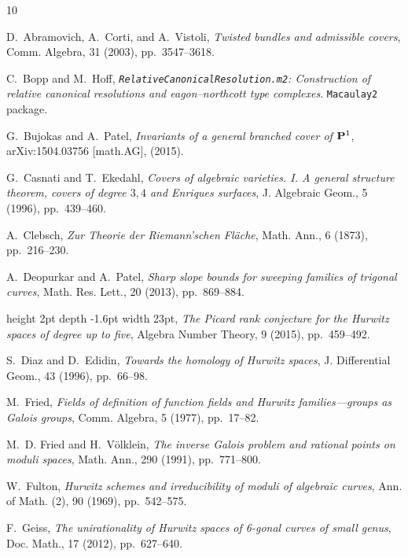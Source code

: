 \documentclass{amsart}
\numberwithin{equation}{section}
\begin{document}
\def\cprime{$'$}
\begin{thebibliography}{10}

{\sc D.~Abramovich, A.~Corti, and A.~Vistoli}, {\em Twisted bundles and
  admissible covers}, Comm. Algebra, 31 (2003), pp.~3547--3618.

{\sc C.~Bopp and M.~Hoff}, {\em \texttt{RelativeCanonicalResolution.m2}:
  Construction of relative canonical resolutions and eagon--northcott type
  complexes}.
\newblock \texttt{Macaulay2} package.

{\sc G.~{Bujokas} and A.~{Patel}}, {\em {Invariants of a general branched cover
  of ${\bf P}^{1}$}}, arXiv:1504.03756 [math.AG],  (2015).

{\sc G.~Casnati and T.~Ekedahl}, {\em Covers of algebraic varieties. {I}. {A}
  general structure theorem, covers of degree {$3,4$} and {E}nriques surfaces},
  J. Algebraic Geom., 5 (1996), pp.~439--460.

{\sc A.~Clebsch}, {\em Zur {T}heorie der {R}iemann'schen {F}l\"ache}, Math.
  Ann., 6 (1873), pp.~216--230.

{\sc A.~Deopurkar and A.~Patel}, {\em Sharp slope bounds for sweeping families
  of trigonal curves}, Math. Res. Lett., 20 (2013), pp.~869--884.

\leavevmode\vrule height 2pt depth -1.6pt width 23pt, {\em The {P}icard rank
  conjecture for the {H}urwitz spaces of degree up to five}, Algebra Number
  Theory, 9 (2015), pp.~459--492.

{\sc S.~Diaz and D.~Edidin}, {\em Towards the homology of {H}urwitz spaces}, J.
  Differential Geom., 43 (1996), pp.~66--98.

{\sc M.~Fried}, {\em Fields of definition of function fields and {H}urwitz
  families---groups as {G}alois groups}, Comm. Algebra, 5 (1977), pp.~17--82.

{\sc M.~D. Fried and H.~V{\"o}lklein}, {\em The inverse {G}alois problem and
  rational points on moduli spaces}, Math. Ann., 290 (1991), pp.~771--800.

{\sc W.~Fulton}, {\em Hurwitz schemes and irreducibility of moduli of algebraic
  curves}, Ann. of Math. (2), 90 (1969), pp.~542--575.

{\sc F.~Geiss}, {\em The unirationality of {H}urwitz spaces of 6-gonal curves
  of small genus}, Doc. Math., 17 (2012), pp.~627--640.


\end{thebibliography}
\end{document}
